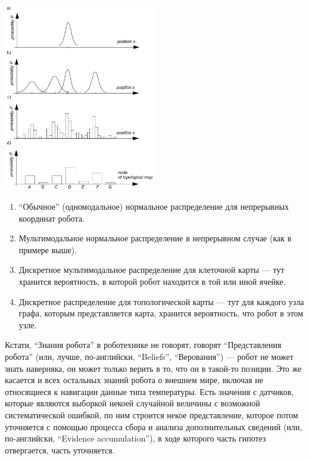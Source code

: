 \documentclass{../../text-style}
\begin{document}
\begin{center}
    \includegraphics[width=0.5\textwidth]{beliefRepresentation.png}
\end{center}

\begin{enumerate}
    \renewcommand{\labelenumi}{\alph{enumi}}
    \item \enquote{Обычное} (одномодальное) нормальное распределение для непрерывных координат робота.
    \item Мультимодальное нормальное распределение в непрерывном случае (как в примере выше).
    \item Дискретное мультимодальное распределение для клеточной карты --- тут хранится вероятность, в которой робот находится в той или иной ячейке.
    \item Дискретное распределение для топологической карты --- тут для каждого узла графа, которым представляется карта, хранится вероятность, что робот в этом узле.
\end{enumerate}

Кстати, \enquote{Знания робота} в роботехнике не говорят, говорят \enquote{Представления робота} (или, лучше, по-английски, \foreignquote{english}{Beliefs}, \enquote{Верования}) --- робот не может знать наверняка, он может только верить в то, что он в такой-то позиции.
Это же касается и всех остальных знаний робота о внешнем мире, включая не относящиеся к навигации данные типа температуры.
Есть значения с датчиков, которые являются выборкой некоей случайной величины с возможной систематической ошибкой, по ним строится некое представление, которое потом уточняется с помощью процесса сбора и анализа дополнительных сведений (или, по-английски, \foreignquote{english}{Evidence accumulation}), в ходе которого часть гипотез отвергается, часть уточняется.
\end{document}
